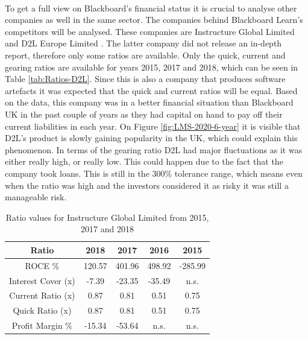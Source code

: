 \documentclass[]{article}
\begin{document}
\paragraph{}
To get a full view on Blackboard's financial status it is crucial to analyse other companies as well in the same sector. The companies behind Blackboard Learn's competitors will be analysed. These companies are Instructure Global Limited \cite{FAME-Instructure} and D2L Europe Limited \cite{FAME-D2L}. The latter company did not release an in-depth report, therefore only some ratios are available. Only the quick, current and gearing ratios are available for years 2015, 2017 and 2018, which can be seen in Table \ref{tab:Ratios-D2L}. Since this is also a company that produces software artefacts it was expected that the quick and current ratios will be equal. Based on the data, this company was in a better financial situation than Blackboard UK in the past couple of years as they had capital on hand to pay off their current liabilities in each year. On Figure \ref{fig:LMS-2020-6-year} it is visible that D2L's product is slowly gaining popularity in the UK, which could explain this phenomenon. In terms of the gearing ratio D2L had major fluctuations as it was either really high, or really low. This could happen due to the fact that the company took loans. This  is still in the 300\% tolerance range, which means even when the ratio was high and the investors considered it as risky it was still a manageable risk.

\begin{table}
\centering
\begin{tabular}{||c | c | c | c | c||} 
\hline
Ratio & 2018 & 2017 & 2016 & 2015 \\ [0.5ex] 
\hline\hline
ROCE \% & 120.57 & 401.96 & 498.92 & -285.99 \\ 
\hline
Interest Cover (x) & -7.39 & -23.35 & -35.49 & n.s. \\ 
\hline
Current Ratio (x) & 0.87 & 0.81 & 0.51 & 0.75 \\ 
\hline
Quick Ratio (x) & 0.87 & 0.81 & 0.51 & 0.75 \\ 
\hline
Profit Margin \% & -15.34 & -53.64 & n.s. & n.s.\\ 
\hline
\end{tabular}
\caption{Ratio values for Instructure Global Limited from 2015, 2017 and 2018 \cite{FAME-Instructure}}
\label{tab:Ratios-Instructure}
\end{table}
\end{document}
